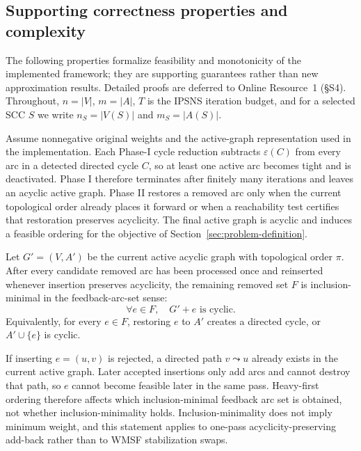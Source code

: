 \subsection{Supporting correctness properties and complexity}
\label{subsec:formal-analysis}

The following properties formalize feasibility and monotonicity of the implemented framework; they are supporting guarantees rather than new approximation results. Detailed proofs are deferred to Online Resource~1 (\S S4). Throughout, \(n=|V|\), \(m=|A|\), \(T\) is the IPSNS iteration budget, and for a selected SCC \(S\) we write \(n_S=|V(S)|\) and \(m_S=|A(S)|\).

\begin{proposition}
\label{prop:lrta-feasibility}
Assume nonnegative original weights and the active-graph representation used in the implementation. Each Phase-I cycle reduction subtracts \(\varepsilon(C)\) from every arc in a detected directed cycle \(C\), so at least one active arc becomes tight and is deactivated. Phase I therefore terminates after finitely many iterations and leaves an acyclic active graph. Phase II restores a removed arc only when the current topological order already places it forward or when a reachability test certifies that restoration preserves acyclicity. The final active graph is acyclic and induces a feasible ordering for the objective of Section~\ref{sec:problem-definition}.
\end{proposition}

\begin{proposition}
\label{prop:addback-correctness}
Let \(G'=(V,A')\) be the current active acyclic graph with topological order \(\pi\). After every candidate removed arc has been processed once and reinserted whenever insertion preserves acyclicity, the remaining removed set \(F\) is inclusion-minimal in the feedback-arc-set sense:
\begin{equation}
    \forall e\in F,\quad G'+e \text{ is cyclic}.
    \label{eq:addback-minimality}
\end{equation}
Equivalently, for every \(e\in F\), restoring \(e\) to \(A'\) creates a directed cycle, or \(A'\cup\{e\}\) is cyclic.

If inserting \(e=(u,v)\) is rejected, a directed path \(v\leadsto u\) already exists in the current active graph. Later accepted insertions only add arcs and cannot destroy that path, so \(e\) cannot become feasible later in the same pass. Heavy-first ordering therefore affects which inclusion-minimal feedback arc set is obtained, not whether inclusion-minimality holds. Inclusion-minimality does not imply minimum weight, and this statement applies to one-pass acyclicity-preserving add-back rather than to WMSF stabilization swaps.
\end{proposition}

